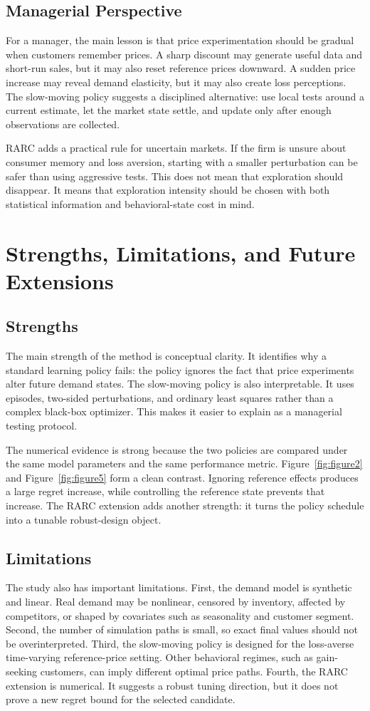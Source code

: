\documentclass[conference]{../../LaTex_Template/IEEEtran}
\begin{document}
\subsection{Managerial Perspective}
For a manager, the main lesson is that price experimentation should be gradual when customers remember prices. A sharp discount may generate useful data and short-run sales, but it may also reset reference prices downward. A sudden price increase may reveal demand elasticity, but it may also create loss perceptions. The slow-moving policy suggests a disciplined alternative: use local tests around a current estimate, let the market state settle, and update only after enough observations are collected.

RARC adds a practical rule for uncertain markets. If the firm is unsure about consumer memory and loss aversion, starting with a smaller perturbation can be safer than using aggressive tests. This does not mean that exploration should disappear. It means that exploration intensity should be chosen with both statistical information and behavioral-state cost in mind.

\section{Strengths, Limitations, and Future Extensions}
\subsection{Strengths}
The main strength of the method is conceptual clarity. It identifies why a standard learning policy fails: the policy ignores the fact that price experiments alter future demand states. The slow-moving policy is also interpretable. It uses episodes, two-sided perturbations, and ordinary least squares rather than a complex black-box optimizer. This makes it easier to explain as a managerial testing protocol.

The numerical evidence is strong because the two policies are compared under the same model parameters and the same performance metric. Figure~\ref{fig:figure2} and Figure~\ref{fig:figure5} form a clean contrast. Ignoring reference effects produces a large regret increase, while controlling the reference state prevents that increase. The RARC extension adds another strength: it turns the policy schedule into a tunable robust-design object.

\subsection{Limitations}
The study also has important limitations. First, the demand model is synthetic and linear. Real demand may be nonlinear, censored by inventory, affected by competitors, or shaped by covariates such as seasonality and customer segment. Second, the number of simulation paths is small, so exact final values should not be overinterpreted. Third, the slow-moving policy is designed for the loss-averse time-varying reference-price setting. Other behavioral regimes, such as gain-seeking customers, can imply different optimal price paths. Fourth, the RARC extension is numerical. It suggests a robust tuning direction, but it does not prove a new regret bound for the selected candidate.
\end{document}

